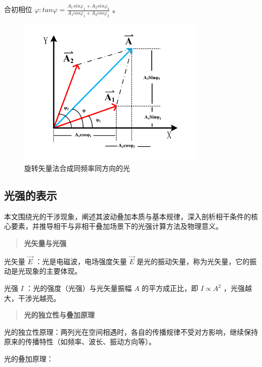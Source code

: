 \documentclass[withoutpreface,bwprint]{cumcmthesis} %
\begin{document}
\begin{appendices}
    合初相位 \(\varphi:tan\varphi = \frac{A_{1}sin\varphi_{1} + A_{2}sin\varphi_{2}}{A_{1}cos\varphi_{1} + A_{2}cos\varphi_{2}}\) 。

    \begin{figure}[!h]
        \centering
        \includegraphics[width=0.8\textwidth]{figures/figure2.png}
        \caption{旋转矢量法合成同频率同方向的光}
        \label{fig:2}
    \end{figure}

    \subsection{光强的表示}
    本文围绕光的干涉现象，阐述其波动叠加本质与基本规律，深入剖析相干条件的核心要素，并推导相干与非相干叠加场景下的光强计算方法及物理意义。


    \begin{quote}
        \textbf{光矢量与光强}
    \end{quote}

    光矢量 $\vec{E}$ ：光是电磁波，电场强度矢量 $\vec{E}$ 是光的振动矢量，称为光矢量，它的振动是光现象的主要体现。

    光强 $I$ ：光的强度（光强）与光矢量振幅 $A$ 的平方成正比，即 $I \propto A^2$ ，光强越大，干涉光越亮。

    \begin{quote}
        \textbf{光的独立性与叠加原理}
    \end{quote}


    光的独立性原理：两列光在空间相遇时，各自的传播规律不受对方影响，继续保持原来的传播特性（如频率、波长、振动方向等）。

    光的叠加原理：


\end{appendices}
\end{document}
